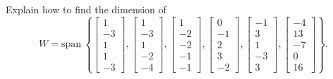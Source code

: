 \documentclass{article}
\begin{document}
\begin{exerciseStatement}
    Explain how to find the dimension of
\[W=\mathrm{span}\ \left\{\left[\begin{array}{r}
1 \\
-3 \\
1 \\
1 \\
-3
\end{array}\right] , \left[\begin{array}{r}
1 \\
-3 \\
1 \\
-2 \\
-4
\end{array}\right] , \left[\begin{array}{r}
1 \\
-2 \\
-2 \\
-1 \\
-1
\end{array}\right] , \left[\begin{array}{r}
0 \\
-1 \\
2 \\
3 \\
-2
\end{array}\right] , \left[\begin{array}{r}
-1 \\
3 \\
1 \\
-3 \\
3
\end{array}\right] , \left[\begin{array}{r}
-4 \\
13 \\
-7 \\
0 \\
16
\end{array}\right]\right\}.\]



  
\end{exerciseStatement}
\end{document}

